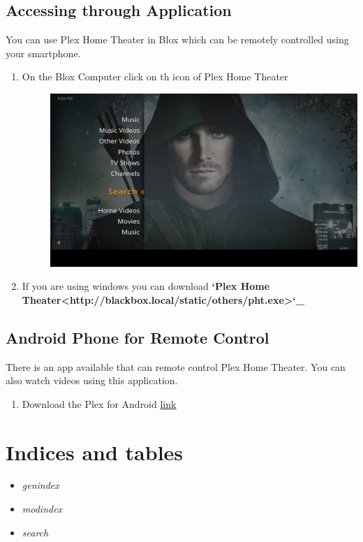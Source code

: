 \documentclass[letterpaper,10pt,english]{sphinxmanual}
\begin{document}
\section{Accessing through Application}
\label{video_and_pictures:id3}\label{video_and_pictures:accessing-through-application}
You can use Plex Home Theater in Blox which can be remotely controlled using your smartphone.
\begin{enumerate}
\item {} \begin{description}
\item[{On the Blox Computer click on th icon of Plex Home Theater}] \leavevmode
\includegraphics{plexhometheater.png}

\end{description}

\item {} 
If you are using windows you can download {\color{red}\bfseries{}{}`Plex Home Theater\textless{}http://blackbox.local/static/others/pht.exe\textgreater{}{}`\_}

\end{enumerate}


\section{Android Phone for Remote Control}
\label{video_and_pictures:android-phone-for-remote-control}
There is an app available that can remote control Plex Home Theater. You can also watch videos using this application.
\begin{enumerate}
\item {} 
Download the Plex for Android \href{http://www.google.com}{link}

\end{enumerate}


\chapter{Indices and tables}
\label{index:indices-and-tables}\begin{itemize}
\item {} 
\emph{genindex}

\item {} 
\emph{modindex}

\item {} 
\emph{search}

\end{itemize}



\renewcommand{\indexname}{Index}
\printindex
\end{document}
